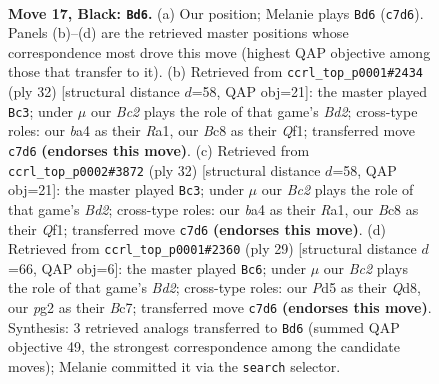 \documentclass[11pt]{article}
\begin{document}
\clearpage

\begin{figure}[p]\centering
\begin{subfigure}{0.46\textwidth}\centering
\resizebox{\linewidth}{!}{%
\newchessgame
\chessboard[
  setfen={r1bq1rk1/ppb3pp/5pn1/3p4/B7/3P1N1P/PPPB1PP1/R2QR1K1 b - - 1 17},
  showmover=false,
  pgfstyle=straightmove, color=movearrow, markmove={c7-d6}
]}
\caption{}
\end{subfigure}\hfill
\begin{subfigure}{0.46\textwidth}\centering
\resizebox{\linewidth}{!}{%
\newchessgame
\chessboard[
  setfen={r3r1k1/1p1bqpp1/p1np1n1p/8/8/4PNP1/PP1B1PBP/R2R1QK1 w - - 0 17},
  showmover=false,
  pgfstyle=straightmove, color=movearrow, markmove={d2-c3}
]}
\caption{}
\end{subfigure}
\\[4pt]
\begin{subfigure}{0.46\textwidth}\centering
\resizebox{\linewidth}{!}{%
\newchessgame
\chessboard[
  setfen={r3r1k1/1p1bqpp1/p1np1n1p/8/8/4PNP1/PP1B1PBP/R2R1QK1 w - - 0 17},
  showmover=false,
  pgfstyle=straightmove, color=movearrow, markmove={d2-c3}
]}
\caption{}
\end{subfigure}\hfill
\begin{subfigure}{0.46\textwidth}\centering
\resizebox{\linewidth}{!}{%
\newchessgame
\chessboard[
  setfen={r2q1rk1/ppbb1pp1/4pn1p/8/1PBB4/P3PN1P/5PP1/R2Q1RK1 b - - 0 15},
  showmover=false,
  pgfstyle=straightmove, color=movearrow, markmove={d7-c6}
]}
\caption{}
\end{subfigure}
\caption{\textbf{Move 17, Black: \texttt{Bd6}.} (a) Our position; Melanie plays \texttt{Bd6} (\texttt{c7d6}). Panels (b)--(d) are the retrieved master positions whose correspondence most drove this move (highest QAP objective among those that transfer to it). (b) Retrieved from \texttt{ccrl\_top\_p0001\#2434} (ply 32) [structural distance $d$=58, QAP obj=21]: the master played \texttt{Bc3}; under $\mu$ our \emph{Bc2} plays the role of that game's \emph{Bd2}; cross-type roles: our \emph{b}a4 as their \emph{R}a1, our \emph{B}c8 as their \emph{Q}f1; transferred move \texttt{c7d6} \textbf{(endorses this move)}. (c) Retrieved from \texttt{ccrl\_top\_p0002\#3872} (ply 32) [structural distance $d$=58, QAP obj=21]: the master played \texttt{Bc3}; under $\mu$ our \emph{Bc2} plays the role of that game's \emph{Bd2}; cross-type roles: our \emph{b}a4 as their \emph{R}a1, our \emph{B}c8 as their \emph{Q}f1; transferred move \texttt{c7d6} \textbf{(endorses this move)}. (d) Retrieved from \texttt{ccrl\_top\_p0001\#2360} (ply 29) [structural distance $d$=66, QAP obj=6]: the master played \texttt{Bc6}; under $\mu$ our \emph{Bc2} plays the role of that game's \emph{Bd2}; cross-type roles: our \emph{P}d5 as their \emph{Q}d8, our \emph{p}g2 as their \emph{B}c7; transferred move \texttt{c7d6} \textbf{(endorses this move)}. Synthesis: 3 retrieved analogs transferred to \texttt{Bd6} (summed QAP objective 49, the strongest correspondence among the candidate moves); Melanie committed it via the \texttt{search} selector.}
\label{fig:thought-m33}
\end{figure}
\end{document}
